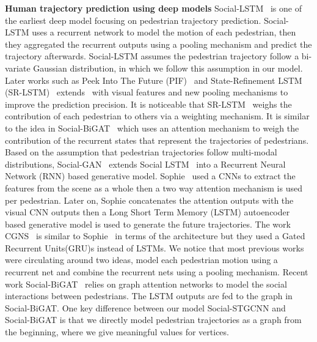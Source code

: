 \documentclass[10pt,twocolumn,letterpaper]{article}
\newcommand*{\ours}{Social-STGCNN }
\begin{document}
\noindent
\textbf{Human trajectory prediction using deep models}
Social-LSTM~\cite{alahi2016social} is one of the earliest deep model focusing on pedestrian trajectory prediction. Social-LSTM uses a recurrent network to model the motion of each pedestrian, then they aggregated the recurrent outputs using a pooling mechanism and predict the trajectory afterwards. Social-LSTM assumes the pedestrian trajectory follow a bi-variate Gaussian distribution, in which we follow this assumption in our model. Later works such as Peek Into The Future (PIF)~\cite{liang2019peeking} and State-Refinement LSTM (SR-LSTM)~\cite{zhang2019sr} extends~\cite{alahi2016social} with visual features and new pooling mechanisms to improve the prediction precision. It is noticeable that SR-LSTM~\cite{zhang2019sr} weighs the contribution of each pedestrian to others via a weighting mechanism. It is similar to the idea in Social-BiGAT~\cite{kosaraju2019social} which uses an attention mechanism to weigh the contribution of the recurrent states that represent the trajectories of pedestrians. Based on the assumption that pedestrian trajectories follow multi-modal distributions, Social-GAN~\cite{gupta2018social} extends Social LSTM~\cite{alahi2016social} into a Recurrent Neural Network (RNN) based generative model. Sophie~\cite{sadeghian2019sophie} used a CNNs to extract the features from the scene as a whole then a two way attention mechanism is used per pedestrian. Later on, Sophie concatenates the attention outputs with the visual CNN outputs then a Long Short Term Memory (LSTM) autoencoder based generative model is used to generate the future trajectories. The work CGNS~\cite{li2019conditional} is similar to Sophie~\cite{sadeghian2019sophie} in terms of the architecture but they used a Gated Recurrent Units(GRU)s instead of LSTMs. We notice that most previous works were circulating around two ideas, model each pedestrian motion using a recurrent net and combine the recurrent nets using a pooling mechanism. Recent work Social-BiGAT~\cite{kosaraju2019social} relies on graph attention networks to model the social interactions between pedestrians. The LSTM outputs are fed to the graph in Social-BiGAT. One key difference between our model \ours and Social-BiGAT is that we directly model pedestrian trajectories as a graph from the beginning, where we give meaningful values for vertices. 
\end{document}
